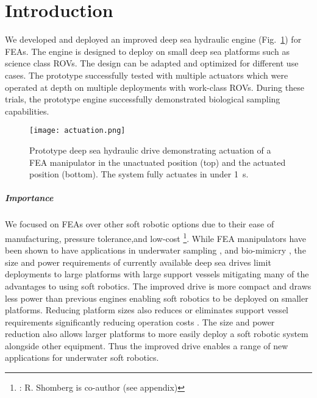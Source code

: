 \hypertarget{ch1:introduction}{%
\section{Introduction}\label{ch1:introduction}}

We developed and deployed an improved deep sea hydraulic engine
(Fig.~\ref{ch1:fig:teaser}) for \glspl{FEA}. The engine is designed to deploy on
small deep sea platforms such as science class \glspl{ROV}. The design can be
adapted and optimized for different use cases.  The prototype successfully tested with multiple
actuators \cite{becker2020mechanically,teeple2020multi} 
which were operated at depth on multiple
deployments with work-class \glspl{ROV}. During these trials, the prototype engine successfully
demonstrated biological sampling capabilities.

\begin{figure}
\hypertarget{ch1:fig:teaser}{%
\centering
\texttt{[image: actuation.png]}
\caption{Prototype deep sea hydraulic drive demonstrating actuation of a
\gls{FEA} manipulator \cite{teeple2020multi} in the unactuated position (top) and the
actuated position (bottom). The system fully actuates in under \SI{1}{\second}.}\label{ch1:fig:teaser}
}
\end{figure}

\hypertarget{ch1:importance}{%
\subparagraph{Importance}\label{ch1:importance}}

We focused on \glspl{FEA} over other soft robotic options due to their ease of
manufacturing, pressure tolerance,and low-cost 
\cite{yin2023rapid}\footnote{\textcite{yin2023rapid}: R. Shomberg is co-author (see appendix)}.
While \gls{FEA} manipulators have been shown to have applications in underwater
sampling \cite{gruber2022advances,mazzeo2022marine,galloway2016soft, subad2021soft, liu2020underwater, tessler2020ultra}, and
bio-mimicry \cite{marchese2014autonomous, chen2022neural, katzschmann2016cyclic, tan2021underwater}, the size and power
requirements of currently available deep sea drives limit deployments to
large platforms with large support vessels mitigating many of the
advantages to using soft robotics. The improved drive is more compact
and draws less power than previous engines enabling soft robotics to be
deployed on smaller platforms. Reducing platform sizes also reduces or
eliminates support vessel requirements significantly reducing operation
costs \cite{amon2022deep}. The size and power reduction also allows larger
platforms to more easily deploy a soft robotic system alongside other
equipment. Thus the improved drive enables a range of new applications
for underwater soft robotics.



